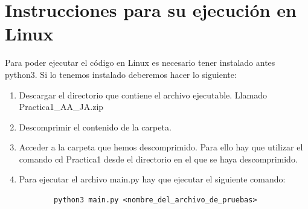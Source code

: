 \section*{Instrucciones para su ejecución en Linux}
Para poder ejecutar el código en Linux es necesario tener instalado antes python3. Si lo tenemos instalado deberemos hacer lo siguiente:\\
\begin{enumerate}
	\item Descargar el directorio que contiene el archivo ejecutable. Llamado Practica1\_AA\_JA.zip
	\item Descomprimir el contenido de la carpeta.
	\item Acceder a la carpeta que hemos descomprimido. Para ello hay que utilizar el comando cd Practica1 desde el directorio en el que se haya descomprimido.
	\item Para ejecutar el archivo main.py hay que ejecutar el siguiente comando:
	\begin{lstlisting}
		python3 main.py <nombre_del_archivo_de_pruebas>
	\end{lstlisting}
\end{enumerate}

